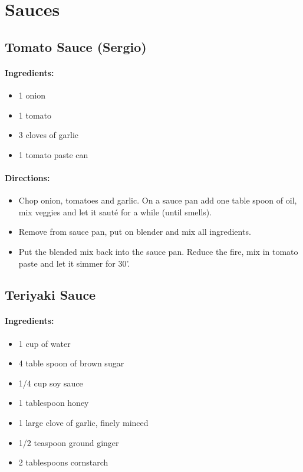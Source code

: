 \documentclass{article}
\begin{document}
\section{Sauces}


\subsection{Tomato Sauce (Sergio)}

\paragraph{Ingredients:}
\begin{itemize}
    \item 1 onion
    \item 1 tomato
    \item 3 cloves of garlic
    \item 1 tomato paste can
\end{itemize}

\paragraph{Directions:}
\begin{itemize}
    \item Chop onion, tomatoes and garlic. On a sauce pan add one table spoon of oil, mix veggies and let it sauté for a while (until smells).
    \item Remove from sauce pan, put on blender and mix all ingredients.
    \item Put the blended mix back into the sauce pan. Reduce the fire, mix in tomato paste and let it simmer for 30'.
\end{itemize}

\subsection{Teriyaki Sauce}

\paragraph{Ingredients:}
\begin{itemize}
    \item 1 cup of water
    \item 4 table spoon of brown sugar
    \item 1/4 cup soy sauce
    \item 1 tablespoon honey
    \item 1 large clove of garlic, finely minced
    \item 1/2 teaspoon ground ginger
    \item 2 tablespoons cornstarch
\end{itemize}
\end{document}
